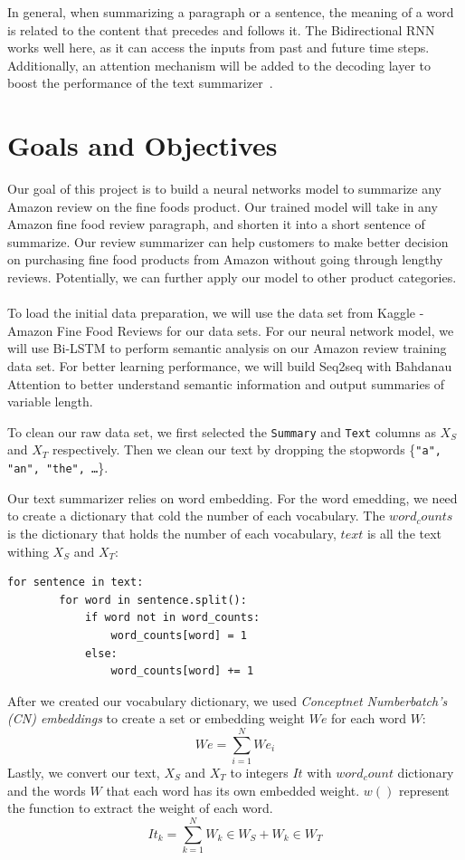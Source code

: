 \documentclass[conference]{IEEEtran}
\begin{document}
\indent In general, when summarizing a paragraph or a sentence, the meaning of a word is related to the content that precedes and follows it. The Bidirectional RNN works well here, as it can access the inputs from past and future time steps. Additionally, an attention mechanism will be added to the decoding layer to boost the performance of the text summarizer~\cite{vaswani2017attention}. 

\section{Goals and Objectives}
Our goal of this project is to build a neural networks model to summarize any Amazon review on the fine foods product. Our trained model will take in any Amazon fine food review paragraph, and shorten it into a short sentence of summarize. Our review summarizer can help customers to make better decision on purchasing fine food products from Amazon without going through lengthy reviews. Potentially, we can further apply our model to other product categories.\\\\

\indent To load the initial data preparation, we will use the data set from Kaggle - Amazon Fine Food Reviews for our data sets. For our neural network model, we will use Bi-LSTM to perform semantic analysis on our Amazon review training data set. For better learning performance, we will build Seq2seq with Bahdanau Attention to better understand semantic information and output summaries of variable length.




\indent To clean our raw data set, we first selected the \texttt{Summary} and \texttt{Text} columns as $X_S$ and $X_T$ respectively. Then we clean our text by dropping the stopwords \{\texttt{"a", "an", "the", \ldots}\}.

\indent Our text summarizer relies on word embedding. For the word emedding, we need to create a dictionary that cold the number of each vocabulary. The $word_counts$ is the dictionary that holds the number of each vocabulary, $text$ is all the text withing $X_S$ and $X_T$:
\begin{lstlisting}
for sentence in text:
        for word in sentence.split():
            if word not in word_counts:
                word_counts[word] = 1
            else:
                word_counts[word] += 1
\end{lstlisting}

\indent After we created our vocabulary dictionary, we used \emph{Conceptnet Numberbatch's (CN) embeddings} to create a set or embedding weight $We$ for each word $W$:
\begin{equation}
    We = \sum_{i = 1}^{N} We_i
\end{equation}
\indent Lastly, we convert our text, $X_S$ and $X_T$ to integers $It$ with $word_count$ dictionary and the words $W$ that each word has its own embedded weight. $w()$ represent the function to extract the weight of each word.
\begin{equation}
    It_k = \sum_{k = 1}^{N}W_k \in W_S + W_k \in W_T
\end{equation}
\end{document}
